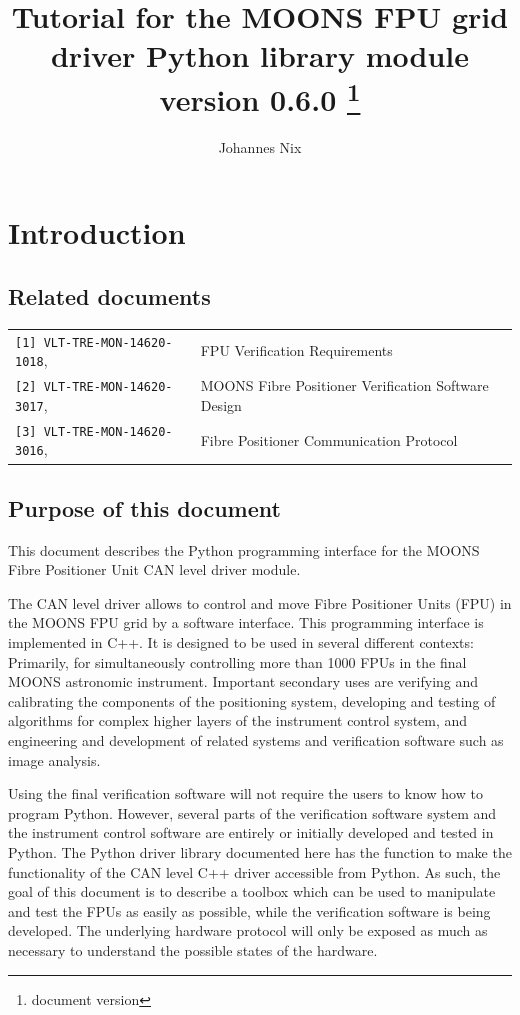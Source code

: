 \documentclass[11pt,a4paper]{report}
\begin{document}
\title{Tutorial for the MOONS FPU grid driver Python library
  module version 0.6.0 \footnote{document version \texttt{}}}

\author{Johannes Nix}

\maketitle

\tableofcontents


\section{Introduction}
\subsection{Related documents}

\begin{tabular}{|ll|}
  \hline
\verb+[1] VLT-TRE-MON-14620-1018+, &  FPU Verification Requirements \\
\verb+[2] VLT-TRE-MON-14620-3017+, & MOONS Fibre Positioner Verification Software Design \\
\verb+[3] VLT-TRE-MON-14620-3016+, & Fibre Positioner Communication Protocol\\
\hline
\end{tabular}


\subsection{Purpose of this document}
This document describes the Python programming interface for the MOONS
Fibre Positioner Unit CAN level driver module.

The CAN level driver allows to control and move Fibre Positioner Units
(FPU) in the MOONS FPU grid by a software interface. This programming
interface is implemented in C++. It is designed to be used in several
different contexts: Primarily, for simultaneously controlling more
than 1000 FPUs in the final MOONS astronomic instrument. Important
secondary uses are verifying and calibrating the components of the
positioning system, developing and testing of algorithms for complex
higher layers of the instrument control system, and engineering and
development of related systems and verification software such as image
analysis.

Using the final verification software will not require the users to
know how to program Python.  However, several parts of the
verification software system and the instrument control software are
entirely or initially developed and tested in Python.  The Python
driver library documented here has the function to make the
functionality of the CAN level C++ driver accessible from Python. As
such, the goal of this document is to describe a toolbox which can be
used to manipulate and test the FPUs as easily as possible, while the
verification software is being developed. The underlying hardware
protocol will only be exposed as much as necessary to understand the
possible states of the hardware.
\end{document}
